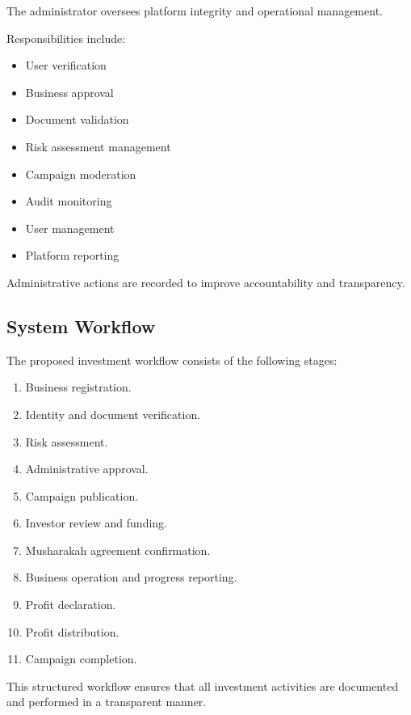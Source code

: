 The administrator oversees platform integrity and operational management.

Responsibilities include:

\begin{itemize}
\item User verification
\item Business approval
\item Document validation
\item Risk assessment management
\item Campaign moderation
\item Audit monitoring
\item User management
\item Platform reporting
\end{itemize}

Administrative actions are recorded to improve accountability and transparency.


\subsection{System Workflow}

The proposed investment workflow consists of the following stages:

\begin{enumerate}
\item Business registration.
\item Identity and document verification.
\item Risk assessment.
\item Administrative approval.
\item Campaign publication.
\item Investor review and funding.
\item Musharakah agreement confirmation.
\item Business operation and progress reporting.
\item Profit declaration.
\item Profit distribution.
\item Campaign completion.
\end{enumerate}

This structured workflow ensures that all investment activities are documented and performed in a transparent manner.


